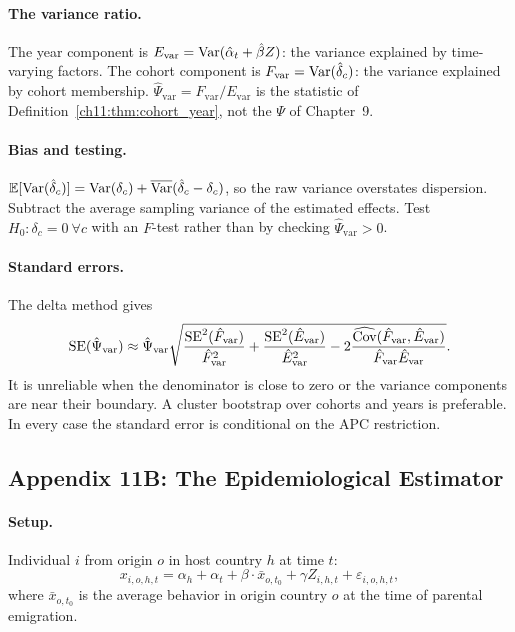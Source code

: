 \documentclass[../structural_economics_book.tex]{subfiles}
\begin{document}
\paragraph{The variance ratio.} The year component is $E_{\text{var}} = \operatorname{Var}(\hat{\alpha}_t + \hat{\beta}Z)$: the variance explained by time-varying factors. The cohort component is $F_{\text{var}} = \operatorname{Var}(\hat{\delta}_c)$: the variance explained by cohort membership. $\hat{\Psi}_{\text{var}} = F_{\text{var}}/E_{\text{var}}$ is the statistic of Definition~\ref{ch11:thm:cohort_year}, not the $\Psi$ of Chapter~9.

\paragraph{Bias and testing.} $\mathbb{E}[\operatorname{Var}(\hat{\delta}_c)] = \operatorname{Var}(\delta_c) + \overline{\operatorname{Var}}(\hat{\delta}_c - \delta_c)$, so the raw variance overstates dispersion. Subtract the average sampling variance of the estimated effects. Test $H_0: \delta_c = 0\ \forall c$ with an $F$-test rather than by checking $\hat{\Psi}_{\text{var}} > 0$.

\paragraph{Standard errors.} The delta method gives
\begin{equation}
\text{SE}(\hat{\Psi}_{\text{var}}) \approx \hat{\Psi}_{\text{var}} \sqrt{\frac{\text{SE}^2(\hat{F}_{\text{var}})}{\hat{F}_{\text{var}}^2} + \frac{\text{SE}^2(\hat{E}_{\text{var}})}{\hat{E}_{\text{var}}^2} - 2\frac{\widehat{\operatorname{Cov}}(\hat{F}_{\text{var}}, \hat{E}_{\text{var}})}{\hat{F}_{\text{var}}\hat{E}_{\text{var}}}}.
\end{equation}
It is unreliable when the denominator is close to zero or the variance components are near their boundary. A cluster bootstrap over cohorts and years is preferable. In every case the standard error is conditional on the APC restriction.


\subsection*{Appendix 11B: The Epidemiological Estimator}
\label{ch11:app:epi}

\paragraph{Setup.} Individual $i$ from origin $o$ in host country $h$ at time $t$:
\begin{equation}
x_{i,o,h,t} = \alpha_h + \alpha_t + \beta \cdot \bar{x}_{o,t_0} + \gamma Z_{i,h,t} + \varepsilon_{i,o,h,t},
\end{equation}
where $\bar{x}_{o,t_0}$ is the average behavior in origin country $o$ at the time of parental emigration.
\end{document}
